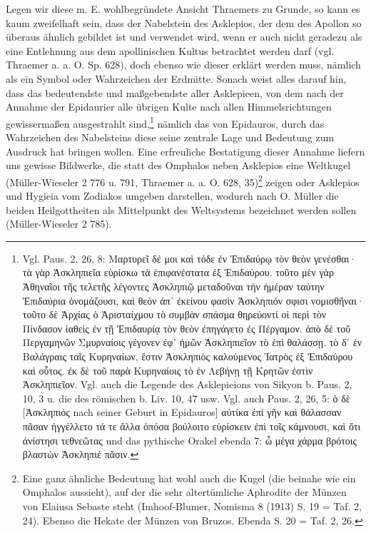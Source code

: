 \documentclass[a4paper, 11pt, oneside]{article}
\begin{document}
Legen wir diese m. E. wohlbegründete Ansicht Thraemers zu Grunde, so kann es kaum zweifelhaft sein, dass der Nabelstein des Asklepios, der dem des Apollon so überaus ähnlich gebildet ist und verwendet wird, wenn er auch nicht geradezu als eine Entlehnung aus dem apollinischen Kultus betrachtet werden darf (vgl. Thraemer a. a. O. Sp. 628), doch ebenso wie dieser erklärt werden muss, nämlich als ein Symbol oder Wahrzeichen der Erdmitte. Sonach weist alles darauf hin, dass das bedeutendste und maßgebendste aller Asklepieen, von dem nach der Annahme der Epidaurier alle übrigen Kulte nach allen Himmelsrichtungen gewissermaßen ausgestrahlt sind,\footnote{Vgl. Paus. 2, 26, 8: Μαρτυρεῖ δέ μοι καὶ τόδε ἐν Ἐπιδαύρῳ τὸν θεὸν γενέσθαι· τὰ γὰρ Ἀσκληπιεῖα εὑρίσκω τὰ ἐπιφανέστατα ἐξ Ἐπιδαύρου. τοῦτο μὲν γὰρ Ἀθηναῖοι τῆς τελετῆς λέγοντες Ἀσκληπιῷ μεταδοῦναι τὴν ἡμέραν ταύτην Ἐπιδαύρια ὀνομάζουσι, καὶ θεὸν ἀπ᾽ ἐκείνου φασὶν Ἀσκληπιόν σφισι νομισθῆναι· τοῦτο δὲ Ἀρχίας ὁ Ἀρισταίχμου τὸ συμβὰν σπάσμα θηρεύοντί οἱ περὶ τὸν Πίνδασον ἰαθεὶς ἐν τῇ Ἐπιδαυρίᾳ τὸν θεὸν ἐπηγάγετο ἐς Πέργαμον. ἀπὸ δὲ τοῦ Περγαμηνῶν Σμυρναίοις γέγονεν ἐφ᾽ ἡμῶν Ἀσκληπιεῖον τὸ ἐπὶ θαλάσσῃ. τὸ δ᾽ ἐν Βαλάγραις ταῖς Κυρηναίων, ἔστιν Ἀσκληπιὸς καλούμενος Ἰατρὸς ἐξ Ἐπιδαύρου καὶ οὗτος. ἐκ δὲ τοῦ παρὰ Κυρηναίοις τὸ ἐν Λεβήνῃ τῇ Κρητῶν ἐστὶν Ἀσκληπιεῖον. Vgl. auch die Legende des Asklepieions von Sikyon b. Paus. 2, 10, 3 u. die des römischen b. Liv. 10, 47 usw. Vgl. auch Paus. 2, 26, 5: ὁ δὲ [Ἀσκληπιός nach seiner Geburt in Epidauros] αὐτίκα ἐπὶ γῆν καὶ θάλασσαν πᾶσαν ἠγγέλλετο τά τε ἄλλα ὁπόσα βούλοιτο εὑρίσκειν ἐπὶ τοῖς κάμνουσι, καὶ ὅτι ἀνίστησι τεθνεῶτας und das pythische Orakel ebenda 7: ὦ μέγα χάρμα βρότοις βλαστὼν Ἀσκληπιὲ πᾶσιν.} nämlich das von Epidauros, durch das Wahrzeichen des Nabelsteins diese seine zentrale Lage und Bedeutung zum Ausdruck hat bringen wollen. Eine erfreuliche Bestatigung dieser Annahme liefern uns gewisse Bildwerke, die statt des Omphalos neben Asklepios eine Weltkugel (Müller-Wieseler 2 776 u. 791, Thraemer a. a. O. 628, 35)\footnote{Eine ganz ähnliche Bedeutung hat wohl auch die Kugel (die beinahe wie ein Omphalos aussieht), auf der die sehr altertümliche Aphrodite der Münzen von Elaiusa Sebaste steht (Imhoof-Blumer, Nomisma 8 (1913) S. 19 = Taf. 2, 24). Ebenso die Hekate der Münzen von Bruzos. Ebenda S. 20 = Taf. 2, 26.} zeigen oder Asklepios und Hygieia vom Zodiakos umgeben darstellen, wodurch nach O. Müller die beiden Heilgottheiten als Mittelpunkt des Weltsystems bezeichnet werden sollen (Müller-Wieseler 2 785).
\end{document}
